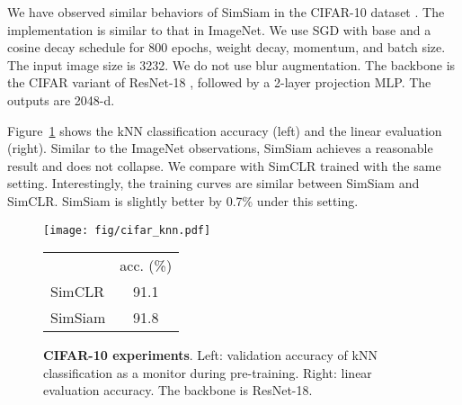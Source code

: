 \documentclass[final]{cvpr}
\newcommand{\tablestyle}[2]{\setlength{\tabcolsep}{#1}\renewcommand{\arraystretch}{#2}\centering\footnotesize}
\begin{document}
We have observed similar behaviors of SimSiam in the CIFAR-10 dataset \cite{Krizhevsky2009}.
The implementation is similar to that in ImageNet.
We use SGD with base  and a cosine decay schedule for 800 epochs, weight decay, momentum, and batch size. The input image size is 3232. We do not use blur augmentation. The backbone is the CIFAR variant of ResNet-18 \cite{He2016}, followed by a 2-layer projection MLP. The outputs are 2048-d.

Figure~\ref{fig:cifar} shows the kNN classification accuracy (left) and the linear evaluation (right). 
Similar to the ImageNet observations, SimSiam achieves a reasonable result and does not collapse.
We compare with SimCLR \cite{Chen2020} trained with the same setting. Interestingly, the training curves are similar between SimSiam and SimCLR. SimSiam is slightly better by 0.7\% under this setting.

\begin{figure}[h]
\begin{minipage}[c]{0.64\linewidth}
\texttt{[image: fig/cifar\_knn.pdf]}
\end{minipage}
\begin{minipage}[c]{0.19\linewidth}
\small
\tablestyle{4pt}{1.2}
\begin{tabular}{l|c}
 & acc. (\%) \\
\shline
SimCLR & 91.1 \\
SimSiam & 91.8 \\
\end{tabular}
\vspace{-.5em}
\end{minipage}
\vspace{.8em}
\caption{
\textbf{CIFAR-10 experiments}. Left: validation accuracy of kNN classification as a monitor during pre-training. Right: linear evaluation accuracy.
The backbone is ResNet-18.
\label{fig:cifar}
\vspace{-.5em}
}
\end{figure}
\end{document}
